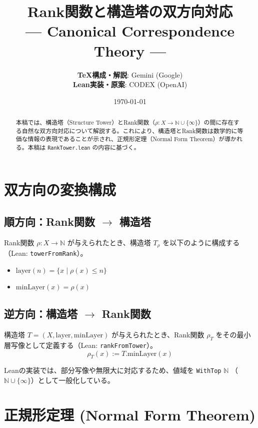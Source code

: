 \documentclass[report, paper=a4, fontsize=11pt, openany]{jlreq}
\title{\textbf{Rank関数と構造塔の双方向対応}\\
\large --- Canonical Correspondence Theory ---}
\author{
  \textbf{TeX構成・解説}: Gemini (Google) \\
  \textbf{Lean実装・原案}: CODEX (OpenAI)
}
\date{\today}
\newcommand{\N}{\mathbb{N}}
\newcommand{\layer}{\mathrm{layer}}
\newcommand{\minLayer}{\mathrm{minLayer}}
\newcommand{\rank}{\rho}
\begin{document}
\maketitle

\begin{abstract}
本稿では、構造塔（Structure Tower）とRank関数（$\rank: X \to \N \cup \{\infty\}$）の間に存在する自然な双方向対応について解説する。これにより、構造塔とRank関数は数学的に等価な情報の表現であることが示され、正規形定理（Normal Form Theorem）が導かれる。本稿は \texttt{RankTower.lean} の内容に基づく。
\end{abstract}

\tableofcontents

\chapter{双方向の変換構成}

\section{順方向：Rank関数 $\to$ 構造塔}

Rank関数 $\rank: X \to \N$ が与えられたとき、構造塔 $T_\rank$ を以下のように構成する（Lean: \texttt{towerFromRank}）。
\begin{itemize}
    \item $\layer(n) = \{ x \mid \rank(x) \le n \}$
    \item $\minLayer(x) = \rank(x)$
\end{itemize}

\section{逆方向：構造塔 $\to$ Rank関数}

構造塔 $T = (X, \layer, \minLayer)$ が与えられたとき、Rank関数 $\rank_T$ をその最小層写像として定義する（Lean: \texttt{rankFromTower}）。
\begin{equation}
    \rank_T(x) := T.\minLayer(x)
\end{equation}

Leanの実装では、部分写像や無限大に対応するため、値域を \texttt{WithTop} $\N$ （$\N \cup \{\infty\}$）として一般化している。

\chapter{正規形定理 (Normal Form Theorem)}
\end{document}
